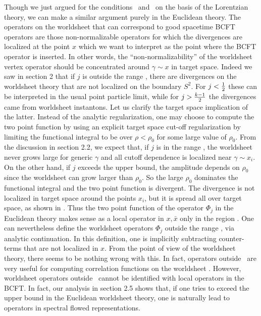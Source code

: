 Though we just argued for the conditions \cont\ and \range\
 on the basis of the Lorentzian
theory, we can make a similar argument purely in the Euclidean
theory. The operators on the worldsheet that can correspond to
good spacetime BCFT operators are those non-normalizable operators
for which the divergences are localized at the point $x$ which
we want to interpret as the point where the BCFT operator is
inserted. In other words, the ``non-normalizability'' of the
worldsheet vertex operator should be concentrated around $\gamma \sim x$
in target space. Indeed we saw in section 2 that if $j$ is outside
the range \range , there are divergences on the worldsheet theory
that are not localized on the boundary $S^2$. For $j<{1 \over 2}$
these can  be interpreted in the usual point particle limit, while
for $j>{k - 1 \over 2}$ the divergences came from worldsheet instantons.
Let us clarify the target space implication of the latter.
Instead of the analytic regularization, one may choose to compute
the two point function by using an explicit target space
cut-off regularization
by limiting the functional integral to be over $\rho < \rho_0$
for some large value of $\rho_0$. From the discussion in section
2.2, we expect that, if $j$ is in the range \range ,
the worldsheet never grows large for generic $\gamma$ and all cutoff
dependence is localized near $\gamma \sim x_i$.
On the other hand,
if $j$ exceeds the upper bound, the amplitude
depends on $\rho_0$ since the
worldsheet can grow larger than $\rho_0$. So the large $\rho_0$
dominates the functional integral and the two point function
is divergent.
The divergence is  not localized in target space around the
points $x_i$, but it is spread all over target space, as
shown in \nontrivial .
Thus the two point function of the operator $\Phi_j$
in the Euclidean theory makes sense as a local operator in $x, \bar x$
only in the region \range . One can nevertheless
define the worldsheet operators $\Phi_j$ outside the range \range  , via
analytic continuation. In this definition, one
 is implicitly subtracting
counter-terms that are not localized in $x$. From the point of view
of the worldsheet theory, there seems to be nothing wrong with this.
In fact,  operators outside
\range\ are very useful for
computing correlation functions on the worldsheet
.
However, worldsheet operators outside \range\ cannot be identified
with local operators in the BCFT.
In fact, our analysis in section 2.5 shows that, if
one tries to exceed the upper bound in the Euclidean
worldsheet theory, one is naturally lead  to  operators
in spectral flowed representations.


